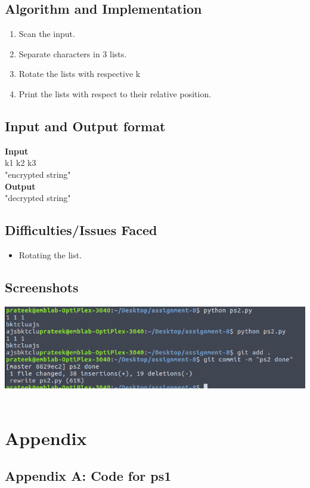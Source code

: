 \documentclass{article}
\begin{document}
\subsection{Algorithm and Implementation}
\begin{enumerate}
\item Scan the input.
\item Separate characters in 3 lists.
\item Rotate the lists with respective k
\item Print the lists with respect to their relative position.  
\end{enumerate}
\subsection{Input and Output format}
\textbf{Input} \\
k1 k2 k3 \\
"encrypted string" \\
\textbf{Output} \\
"decrypted string"
\subsection{Difficulties/Issues Faced}
\begin{itemize}
\item Rotating the list.\cite{grep}
\end{itemize}

\subsection{Screenshots}
\includegraphics[scale = 0.5]{ps2}\\ \\

\pagebreak
\section{Appendix}
\subsection{Appendix A: Code for ps1}
\end{document}
